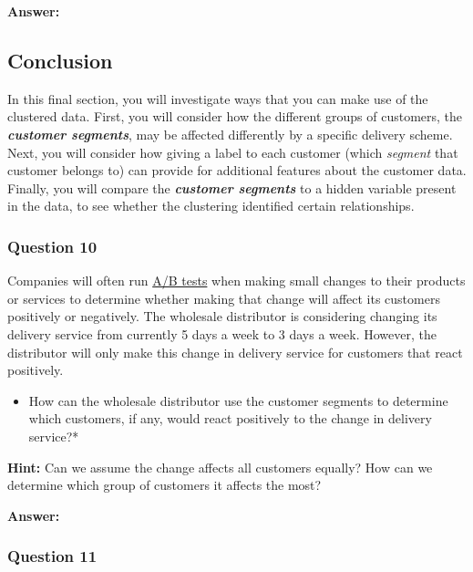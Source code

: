 \documentclass[11pt]{article}
\providecommand{\tightlist}{%
      \setlength{\itemsep}{0pt}\setlength{\parskip}{0pt}}
\begin{document}
    \textbf{Answer:}

    \subsection{Conclusion}\label{conclusion}

    In this final section, you will investigate ways that you can make use
of the clustered data. First, you will consider how the different groups
of customers, the \textbf{\emph{customer segments}}, may be affected
differently by a specific delivery scheme. Next, you will consider how
giving a label to each customer (which \emph{segment} that customer
belongs to) can provide for additional features about the customer data.
Finally, you will compare the \textbf{\emph{customer segments}} to a
hidden variable present in the data, to see whether the clustering
identified certain relationships.

    \subsubsection{Question 10}\label{question-10}

Companies will often run
\href{https://en.wikipedia.org/wiki/A/B_testing}{A/B tests} when making
small changes to their products or services to determine whether making
that change will affect its customers positively or negatively. The
wholesale distributor is considering changing its delivery service from
currently 5 days a week to 3 days a week. However, the distributor will
only make this change in delivery service for customers that react
positively.

\begin{itemize}
\tightlist
\item
  How can the wholesale distributor use the customer segments to
  determine which customers, if any, would react positively to the
  change in delivery service?*
\end{itemize}

\textbf{Hint:} Can we assume the change affects all customers equally?
How can we determine which group of customers it affects the most?

    \textbf{Answer:}

    \subsubsection{Question 11}\label{question-11}
\end{document}
